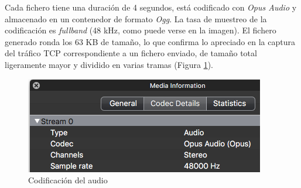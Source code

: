 Cada fichero tiene una duración de 4 segundos, está codificado con \emph{Opus Audio} \cite{OpusCodec} y almacenado en un contenedor de formato \emph{Ogg}. La tasa de muestreo de la codificación es \emph{fullband} (48 kHz, como puede verse en la imagen). El fichero generado ronda los 63 KB de tamaño, lo que confirma lo apreciado en la captura del tráfico TCP correspondiente a un fichero enviado, de tamaño total ligeramente mayor y dividido en varias tramas (Figura \ref{audioInfo}).

\begin{figure}[!t]
\begin{center}
\includegraphics[width=0.5\linewidth]{./6_EvalEmpirica/Img/audioInfo.png}
\end{center}
\caption{Codificación del audio}
\label{audioInfo}
\end{figure}